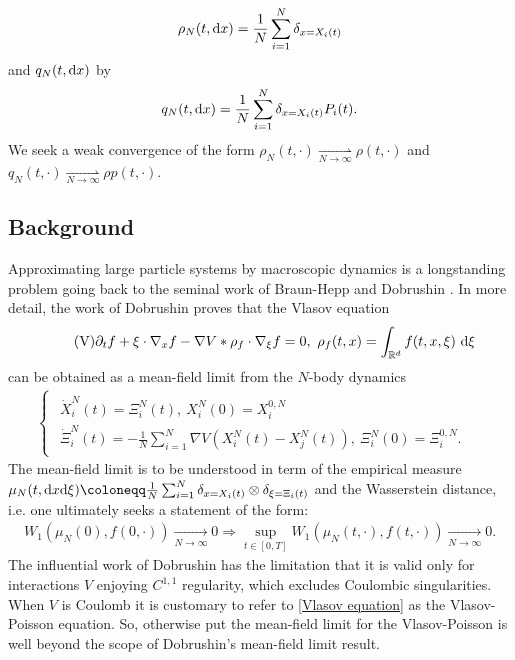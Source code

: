\documentclass[11pt,reqno]{amsart}
\numberwithin{equation}{section}
\def\dd{{\rm d}}
\begin{document}
\begin{align}
\rho_{N}(t,\dd x)=\frac{1}{N}\sum_{i=1}^{N}\delta_{x=X_{i}(t)} \label{spatial empirical measure def}    
\end{align}
and $q_{N}(t,\dd x)$ by 
\begin{align}
q_{N}(t,\dd x)=\frac{1}{N}\sum_{i=1}^{N}\delta_{x=X_{i}(t)}P_{i}(t). \label{empirical momentum def}  \end{align}
We seek a weak convergence of the form $\rho_{N}(t,\cdot)\underset{N\rightarrow \infty}{\rightharpoonup}\rho(t,\cdot)$ and $q_{N}(t,\cdot)\underset{N\rightarrow \infty}{\rightharpoonup} \rho p(t,\cdot)$. 
\subsection{Background} Approximating large particle systems by macroscopic dynamics is a longstanding problem going back to the seminal work of Braun-Hepp \cite{braun1977vlasov} and Dobrushin \cite{dobrushin1979vlasov}. In more detail, the work of Dobrushin 
proves that the Vlasov equation 
\begin{align}\tag{V}
\partial_{t}f+\xi\cdot\nabla_{x}f-\nabla V\ast \rho_{f}\cdot \nabla_{\xi}f=0, \ \rho_{f}(t,x)=\int_{\mathbb{R}^{d}}f(t,x,\xi)\ \dd \xi \label{Vlasov equation}
\end{align}
can be obtained as a mean-field limit from the $N$-body dynamics 
\begin{align}
\begin{cases}
\begin{array}{lc}
    \dot X_{i}^{N}(t)=\Xi_{i}^{N}(t), \ X_{i}^{N}(0)=X_{i}^{0,N} &  \\
     \dot \Xi_{i}^{N}(t)=-\frac{1}{N}\sum_{i=1}^{N}\nabla V(X_{i}^{N}(t)-X_{j}^{N}(t)), \ \Xi_{i}^{N}(0)=\Xi_{i}^{0,N}.&  
\end{array}
\end{cases}
\label{N body nonrel}
\end{align}
The mean-field limit is to be understood in term of the empirical measure $\mu_{N}(t,\dd x\dd \xi)\coloneqq \frac{1}{N}\sum_{i=1}^{N}\delta_{x=X_{i}(t)}\otimes \delta_{\xi=\Xi_{i}(t)}$ and the Wasserstein distance, i.e. one ultimately seeks a statement of the form: 
\begin{align*}
W_{1}(\mu_{N}(0),f(0,\cdot))\underset{N\rightarrow \infty}{\rightarrow} 0\Rightarrow \underset{t\in [0,T]}{\sup}W_{1}(\mu_{N}(t,\cdot),f(t,\cdot))\underset{N\rightarrow \infty}{\rightarrow}0.  \end{align*}
The influential work of Dobrushin has the limitation that it is valid only for interactions $V$ enjoying $C^{1,1}$ regularity, which excludes Coulombic singularities. When $V$ is Coulomb it is customary to refer to \eqref{Vlasov equation} as the Vlasov-Poisson equation. So, otherwise put the mean-field limit for the Vlasov-Poisson is well beyond the scope of Dobrushin's mean-field limit result.   
\end{document}
